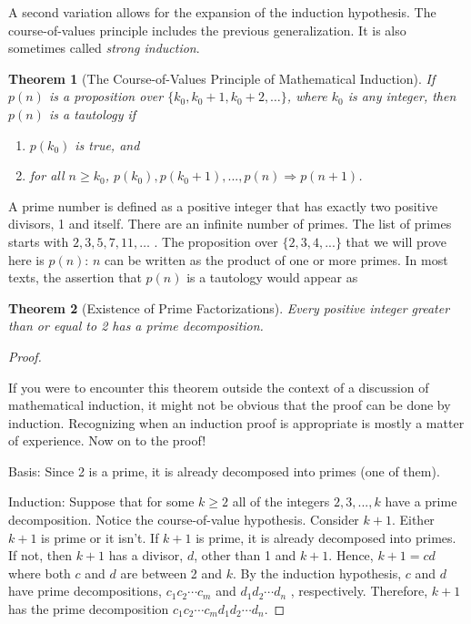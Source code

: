 \documentclass[10pt,]{book}
\theoremstyle{plain}
\newtheorem{theorem}{Theorem}[section]
\theoremstyle{definition}
\theoremstyle{definition}
\theoremstyle{definition}
\theoremstyle{definition}
\begin{document}
\par
A second variation allows for the expansion of the induction hypothesis. The course-of-values principle includes the previous generalization.  It is also sometimes called \emph{strong induction}.%
\begin{theorem}[The Course-of-Values Principle of Mathematical Induction]\label{th-math-induction-course-of-values}
 If \(p(n)\) is a proposition over \(\{k_0 , k_0+ 1, k_0+ 2,\ldots  \}\), where
\(k_0\) is any integer, then \(p(n)\) is a tautology if%
\par
\leavevmode%
\begin{enumerate}[label=\arabic*]
\item\hypertarget{li-267}{}\(p(k_0)\) is true, and%
\item\hypertarget{li-268}{}for all \(n\geq k_0\),   \(p(k_0), p(k_0 + 1), . . . , p(n) \Rightarrow  p(n + 1) \).%
\end{enumerate}

%
\end{theorem}
\par
 A prime number is defined as a positive integer that has exactly two positive divisors, 1 and itself. There are an infinite number of primes. The list of primes starts with \(2, 3, 5, 7, 11,\ldots \) .  The proposition over \(\{2, 3, 4, . . .\}\)  that we will prove here is \(p(n)\): \(n\) can be written as the product of one or more primes.  In most texts, the assertion that \(p(n)\) is a tautology would appear as%
\begin{theorem}[Existence of Prime Factorizations]\label{th-prime-factorizations-exist}
Every positive integer greater than or equal to 2 has a prime decomposition.%
\end{theorem}
\begin{proof}\hypertarget{proof-1}{}
If you were to encounter this theorem outside the context of a discussion of mathematical induction, it might not be obvious that the proof can be done by induction. Recognizing when an induction proof is appropriate is mostly a matter of experience. Now on to the proof!%
\par
Basis:  Since 2 is a prime, it is already decomposed into primes (one of them).%
\par
Induction:  Suppose that for some \(k \geq  2\) all of the integers \(2,3, . . . , k\) have a prime decomposition.  Notice the course-of-value hypothesis.  Consider \(k + 1\). Either \(k + 1\) is prime or it isn't.   If \(k + 1\) is prime, it is already decomposed into primes. If not, then \(k + 1\) has a divisor, \(d\), other than 1 and \(k + 1\). Hence, \(k + 1 = c d\) where both \(c\) and \(d\) are between 2 and \(k\). By the induction hypothesis, \(c\) and \(d\) have prime decompositions, \(c_1 c_2 \cdots  c_m\) and \(d_1 d_2 \cdots d_n\) , respectively. Therefore, \(k + 1\) has the prime decomposition \(c_1 c_2 \cdots  c_m d_1 d_2 \cdots  d_n\).%
\end{proof}
\end{document}

